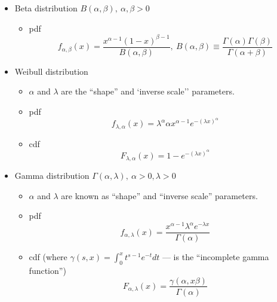 \documentclass[12pt]{article}
\begin{document}
\begin{itemize}
	\item Beta distribution $B(\alpha, \beta),\ \alpha, \beta > 0$
	\begin{itemize}
		\item pdf
		\begin{equation}\label{beta_pdf}
			f_{\alpha, \beta}(x) = \frac{x^{\alpha-1} (1-x)^{\beta-1}}{B(\alpha, \beta)},\ B(\alpha, \beta) \equiv \frac{\Gamma(\alpha)\Gamma(\beta)}{\Gamma(\alpha+\beta)}
		\end{equation}

	\end{itemize}

	\item Weibull distribution
	\begin{itemize}
		\item $\alpha$ and $\lambda$ are the ``shape'' and `inverse scale'' parameters.
		\item pdf
		\begin{equation}\label{weibull_pdf}
			f_{\lambda, \alpha}(x) = \lambda^{\alpha}\alpha x^{\alpha-1} e^{-(\lambda x)^{\alpha}}
		\end{equation}
		\item cdf
		\begin{equation}\label{weibull_cdf}
			F_{\lambda, \alpha}(x) = 1 - e^{-(\lambda x)^\alpha}
		\end{equation}
	\end{itemize}

	\item Gamma distribution $\Gamma(\alpha, \lambda),\ \alpha >0, \lambda > 0$
	\begin{itemize}
		\item $\alpha$ and $\lambda$ are known as ``shape'' and ``inverse scale'' parameters.
		\item pdf
			\begin{equation}\label{gamma_pdf}
				f_{\alpha, \lambda} (x)= \frac{x^{\alpha - 1} \lambda^{\alpha}e^{-\lambda x}}{\Gamma(\alpha)}
			\end{equation}
		\item cdf (where $\gamma(s, x) = \int_0^x t^{s-1}e^{-t}dt$ --- is the ``incomplete gamma function'')
			\begin{equation}
				F_{\alpha,\lambda}(x) = \frac{\gamma(\alpha, x\beta)}{\Gamma(\alpha)}
			\end{equation}


	\end{itemize}
\end{itemize}
\end{document}
